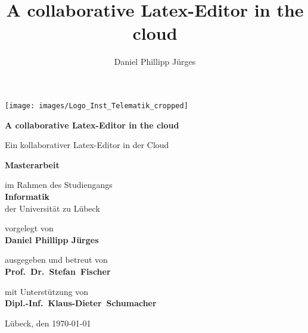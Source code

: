 \documentclass[11pt,twoside,a4paper,BCOR8.25mm,DIV10,headsepline,footsepline]{scrbook}
\begin{document}
	\begin{titlepage}

	\title{A collaborative Latex-Editor in the cloud}
	\author{Daniel Phillipp Jürges}

	{\Large
		\texttt{[image: images/Logo\_Inst\_Telematik\_cropped]}
		\vskip 44pt


		{\LARGE\bf A collaborative Latex-Editor in the cloud\par}
		{\LARGE Ein kollaborativer Latex-Editor in der Cloud\par}

		\titlepageskip
		{\bf Masterarbeit}

		\titlepageskip
		im Rahmen des Studiengangs\\
		{\bf Informatik}\\
		der Universität zu Lübeck

		\titlepageskip
		vorgelegt von\\
		{\bf Daniel Phillipp Jürges}

		\titlepageskip
		ausgegeben und betreut von\\
		{\bf Prof.~Dr.~Stefan~Fischer}

		\titlepageskip
		{
			mit Unterstützung von\\
			{\bf Dipl.-Inf.~Klaus-Dieter~Schumacher}\\
		}


		\vfill 
		{
			Lübeck, den \today
		}
	}
	\end{titlepage}
\end{document}
